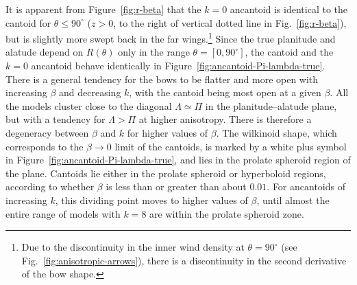 It is apparent from Figure~\ref{fig:r-beta} that the \(k=0\) ancantoid
is identical to the cantoid for \(\theta \le 90^\circ\) (\(z > 0\), to the right
of vertical dotted line in Fig.~\ref{fig:r-beta}), but is slightly
more swept back in the far wings.\footnote{%
  \label{fn:discontinuity}
  Due to the discontinuity in the inner wind density at
  \(\theta = 90^\circ\) (see Fig.~\ref{fig:anisotropic-arrows}), there is a
  discontinuity in the second derivative of the bow shape.} %
Since the true planitude and alatude depend on \(R(\theta)\) only in the
range \(\theta = [0, 90^\circ]\), the cantoid and the \(k = 0\) ancantoid
behave identically in Figure~\ref{fig:ancantoid-Pi-lambda-true}.
There is a general tendency for the bows to be flatter and more open
with increasing \(\beta\) and decreasing \(k\), with the cantoid being
most open at a given \(\beta\).  All the models cluster close to the
diagonal \(\Lambda \simeq \Pi\) in the planitude--alatude plane, but with a tendency
for \(\Lambda > \Pi\) at higher anisotropy.  There is therefore a degeneracy
between \(\beta\) and \(k\) for higher values of \(\beta\).  The wilkinoid
shape, which corresponds to the \(\beta \to 0\) limit of the cantoids, is
marked by a white plus symbol in
Figure~\ref{fig:ancantoid-Pi-lambda-true}, and lies in the prolate
spheroid region of the plane.  Cantoids lie either in the prolate
spheroid or hyperboloid regions, according to whether \(\beta\) is less
than or greater than about \(0.01\).  For ancantoids of increasing
\(k\), this dividing point moves to higher values of \(\beta\), until
almost the entire range of models with \(k = 8\) are within the
prolate spheroid zone.

